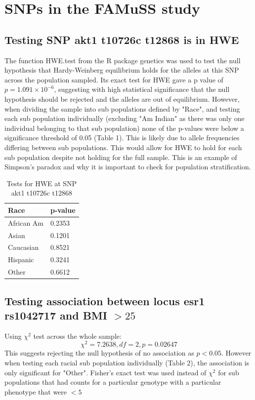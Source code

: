 \documentclass{article}
\begin{document}
	\section{SNPs in the FAMuSS study}
	
	\subsection{Testing SNP akt1 t10726c t12868 is in HWE}
	
	The function HWE.test from the R package genetics was used to test the null hypothesis that Hardy-Weinberg equilibrium holds for the alleles at this SNP across the population sampled. Its exact test for HWE gave a p value of $p = 1.091 \times10^{-6}$, suggesting with high statistical significance that the null hypothesis should be rejected and the alleles are out of equilibrium. However, when dividing the sample into sub populations defined by "Race", and testing each sub population individually (excluding "Am Indian" as there was only one individual belonging to that sub population) none of the p-values were below a significance threshold of 0.05 (Table 1). This is likely due to allele frequencies differing between sub populations. This would allow for HWE to hold for each sub population despite not holding for the full sample. This is an example of Simpson's paradox and why it is important to check for population stratification.
	
	\begin{table}[H]
		
		\centering
		\begin{tabular}{ll}
			Race       & p-value \\ \hline
			African Am & 0.2353  \\
			Asian      & 0.1201  \\
			Caucasian  & 0.8521  \\
			Hispanic   & 0.3241  \\
			Other      & 0.6612 
		\end{tabular}
		\caption{Tests for HWE at SNP akt1 t10726c t12868} \label{tab:title}
	\end{table}
	
	\subsection{Testing association between locus esr1 rs1042717 and BMI $> 25$}
	
	Using $\chi^2$ test across the whole sample:
	\[\chi^2 = 7.2638, df = 2, p = 0.02647\]
	This suggests rejecting the null hypothesis of no association as $p < 0.05$. However when testing each racial sub population individually (Table 2), the association is only significant for "Other". Fisher's exact test was used instead of $\chi^2$ for sub populations that had counts for a particular genotype with a particular phenotype that were $< 5$
	
\end{document}
